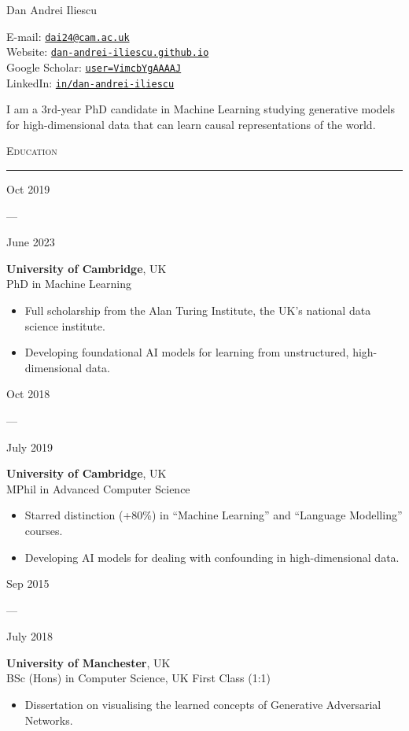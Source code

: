 \documentclass[a4paper]{article}
\newcommand{\entry}[6]{
    \begin{minipage}[t]{.05\textwidth}
        \centering #1
    \end{minipage}
    ---
    \begin{minipage}[t]{.05\textwidth}
        \centering #2
    \end{minipage}
    \hfill
    \begin{minipage}[t]{.85\textwidth}
        \textbf{#3}, #4\\
        #5\\
        \vspace{-1em}
        #6
    \end{minipage}
}
\begin{document}
\begin{minipage}[t]{.5\textwidth}
    \huge \sc Dan Andrei Iliescu
\end{minipage}
\hfill
\begin{minipage}[t]{.5\textwidth}
    \flushright
    E-mail: \href{dai24@cam.ac.uk}{\texttt{dai24@cam.ac.uk}}\\
    Website: \href{https://dan-andrei-iliescu.github.io/}{\texttt{dan-andrei-iliescu.github.io}}\\
    Google Scholar: \href{https://scholar.google.com/citations?user=VimcbYgAAAAJ}{\texttt{user=VimcbYgAAAAJ}}\\
    LinkedIn: \href{https://www.linkedin.com/in/dan-andrei-iliescu/}{\texttt{in/dan-andrei-iliescu}}
\end{minipage}

\vspace{2em}

I am a 3rd-year PhD candidate in Machine Learning studying generative models for high-dimensional data that can learn causal representations of the world.

\vspace{1em}

\textsc{\Large Education}

\rule{\textwidth}{1pt}

\entry{Oct 2019}{June 2023}{University of Cambridge}{UK}{PhD in Machine Learning}{
    \begin{itemize}[leftmargin=*]
        \item Full scholarship from the Alan Turing Institute, the UK's national data science institute.
        \item Developing foundational AI models for learning from unstructured, high-dimensional data.
    \end{itemize}
}

\entry{Oct 2018}{July 2019}{University of Cambridge}{UK}{MPhil in Advanced Computer Science}{
    \begin{itemize}[leftmargin=*]
        \item Starred distinction (+80\%) in ``Machine Learning'' and ``Language Modelling'' courses.
        \item Developing AI models for dealing with confounding in high-dimensional data. 
    \end{itemize}
}

\entry{Sep 2015}{July 2018}{University of Manchester}{UK}{BSc (Hons) in Computer Science, UK First Class (1:1)}{
    \begin{itemize}[leftmargin=*]
        \item Dissertation on visualising the learned concepts of Generative Adversarial Networks. 
    \end{itemize}
}
\end{document}
